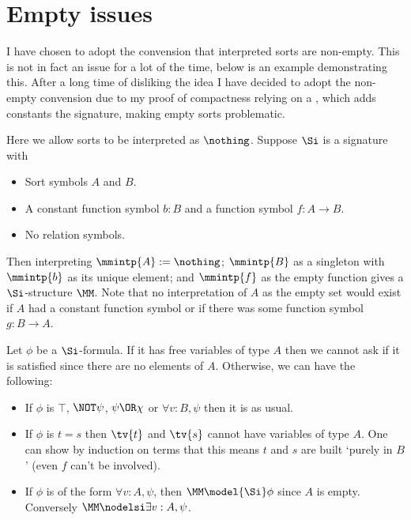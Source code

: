 \section{Empty issues}
I have chosen to adopt the convension that interpreted sorts 
are non-empty.
This is not in fact an issue for a lot of the time, below is an example 
demonstrating this.
After a long time of disliking the idea I have decided to adopt the 
non-empty convension due to my proof of compactness 
relying on a ,
which adds constants the signature, 
making empty sorts problematic.

\begin{eg}
    Here we allow sorts to be interpreted as $\nothing$.
    Suppose $\Si$ is a signature with 
    \begin{itemize}
        \item Sort symbols $A$ and $B$.
        \item A constant function symbol $b : B$ and a function symbol 
        $f : A \to B$.
        \item No relation symbols.
    \end{itemize} 
    Then interpreting $\mmintp{A} := \nothing$; 
    $\mmintp{B}$ as a singleton with $\mmintp{b}$ as its
    unique element; and $\mmintp{f}$ as the empty function 
    gives a $\Si$-structure $\MM$.
    Note that no interpretation of $A$ as the empty set 
    would exist if $A$ had a constant function symbol 
    or if there was some function symbol $g : B \to A$.
    
    Let $\phi$ be a $\Si$-formula.
    If it has free variables of type $A$ then we cannot ask if it is satisfied 
    since there are no elements of $A$.
    Otherwise, we can have the following:
    \begin{itemize}
        \item If $\phi$ is $\top$, $\NOT \psi$, $\psi \OR \chi$ or 
            $\forall v : B, \psi$ then it is as usual.
        \item If $\phi$ is $t = s$ then $\tv{t}$ and $\tv{s}$ 
        cannot have variables 
            of type $A$. One can show by induction on terms that this means 
            $t$ and $s$ are built `purely in $B$' (even $f$ can't be involved).
            \vspace{1em}
        \item If $\phi$ is of the form
            $\forall v : A, \psi$, then $\MM \model{\Si} \phi$ 
            since $A$ is empty.
            Conversely $\MM \nodelsi \exists v : A, \psi$.
    \end{itemize}
\end{eg}
